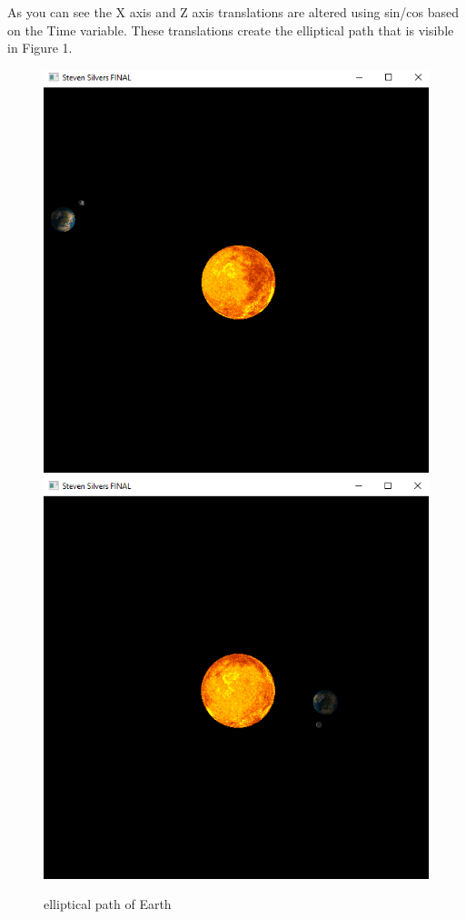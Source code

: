 \documentclass[12pt,serif,draftclsnofoot,onecolumn]{IEEEtran}
\begin{document}
			As you can see the X axis and Z axis translations are altered using sin/cos based on the Time variable. These translations create the elliptical path that is visible in Figure 1.
	\begin{figure}[h]
		\includegraphics[scale=.5]{cap3}
		\includegraphics[scale=.5]{cap1}
		\caption{elliptical path of Earth}
	\end{figure}
\end{document}
